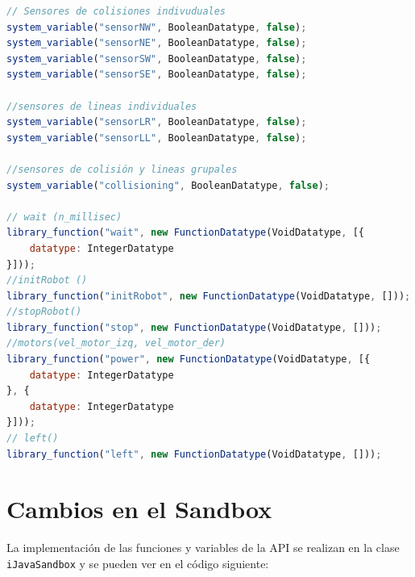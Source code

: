 \begin{lstlisting}[language={Javascript},label={code:cambios-ijava-sintactico}, caption={Definición de las funciones y variables de la  API del simulador.}]
// Sensores de colisiones indivuduales
system_variable("sensorNW", BooleanDatatype, false);
system_variable("sensorNE", BooleanDatatype, false);
system_variable("sensorSW", BooleanDatatype, false);
system_variable("sensorSE", BooleanDatatype, false);

//sensores de lineas individuales
system_variable("sensorLR", BooleanDatatype, false);
system_variable("sensorLL", BooleanDatatype, false);

//sensores de colisión y lineas grupales
system_variable("collisioning", BooleanDatatype, false);

// wait (n_millisec)
library_function("wait", new FunctionDatatype(VoidDatatype, [{
	datatype: IntegerDatatype
}]));
//initRobot ()
library_function("initRobot", new FunctionDatatype(VoidDatatype, []));
//stopRobot()
library_function("stop", new FunctionDatatype(VoidDatatype, []));
//motors(vel_motor_izq, vel_motor_der)
library_function("power", new FunctionDatatype(VoidDatatype, [{
	datatype: IntegerDatatype
}, {
	datatype: IntegerDatatype
}]));
// left()
library_function("left", new FunctionDatatype(VoidDatatype, []));
\end{lstlisting}



\section*{Cambios en el Sandbox}


La implementación de las funciones y variables de la API se realizan en la clase \texttt{iJavaSandbox} y se pueden ver en el código siguiente:

